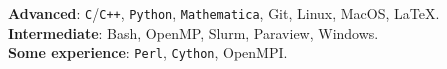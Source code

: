 \documentclass[10.5pt, oneside]{article}   	%
\begin{document}
\textbf{Advanced}: \texttt{C}/\texttt{C++}, \texttt{Python}, \texttt{Mathematica}, Git, Linux, MacOS, \LaTeX. \vspace{1.5mm} \\ 
\textbf{Intermediate}: Bash, OpenMP, Slurm, Paraview, Windows. \vspace{1.5mm}\\
\textbf{Some experience}: \texttt{Perl}, \texttt{Cython}, OpenMPI.

\end{document}

